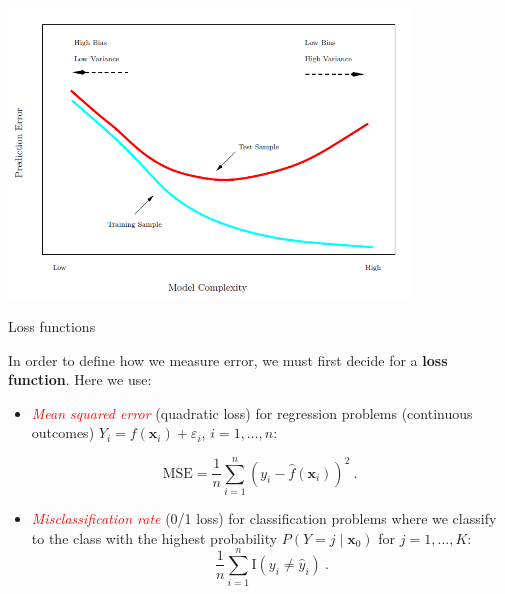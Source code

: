 \documentclass[10pt,ignorenonframetext,]{beamer}
\providecommand{\tightlist}{%
  \setlength{\itemsep}{0pt}\setlength{\parskip}{0pt}}
\begin{document}
\begin{frame}

\centering
\includegraphics[width=0.80000\textwidth]{training_test.png}

\end{frame}

\begin{frame}

\begin{block}{Loss functions}

\vspace{2mm}

In order to define how we measure error, we must first decide for a
\textbf{loss function}. Here we use:

\vspace{2mm}

\begin{itemize}
\tightlist
\item
  \emph{\textcolor{red}{Mean squared error}} (quadratic loss) for
  regression problems (continuous outcomes)
  \(Y_i=f({\boldsymbol x}_i)+\varepsilon_i\), \(i=1,\ldots, n\):
\end{itemize}

\[\text{MSE}=\frac{1}{n}\sum_{i=1}^n (y_i-\hat{f}({\boldsymbol x}_i))^2 \ .\]

\begin{itemize}
\tightlist
\item
  \emph{\textcolor{red}{Misclassification rate}} (0/1 loss) for
  classification problems where we classify to the class with the
  highest probability \(P(Y=j\mid {\boldsymbol x}_0)\) for
  \(j=1,\ldots,K\):
  \[\frac{1}{n}\sum_{i=1}^n \text{I}(y_i \neq \hat{y}_i) \ .\]
\end{itemize}

\end{block}

\end{frame}
\end{document}
